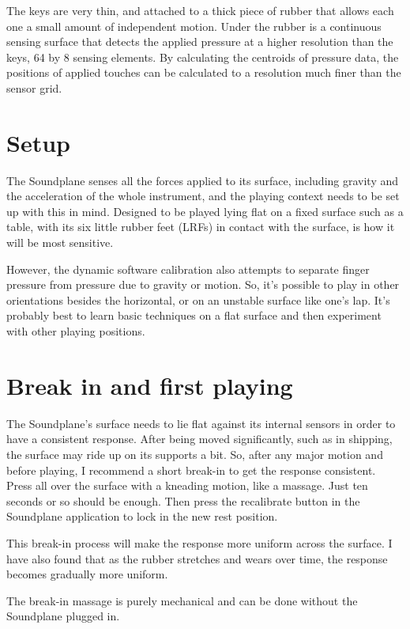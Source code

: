 The keys are very thin, and attached to a thick piece of rubber that allows each one a small amount of independent motion.  Under the rubber is a continuous sensing surface that detects the applied pressure at a higher resolution than the keys, 64 by 8 sensing elements.  By calculating the centroids of pressure data, the positions of applied touches can be calculated to a resolution much finer than the sensor grid.  

\section{Setup}

The Soundplane senses all the forces applied to its surface, including gravity and the acceleration of the whole instrument, and the playing context needs to be set up with this in mind.  Designed to be played lying flat on a fixed surface such as a table, with its six little rubber feet (LRFs) in contact with the surface, is how it will be most sensitive.  

However, the dynamic software calibration also attempts to separate finger pressure from pressure due to gravity or motion.  So, it’s possible to play in other orientations besides the horizontal, or on an unstable surface like one’s lap.  It's probably best to learn basic techniques on a flat surface and then experiment with other playing positions. 

\section{Break in and first playing}

The Soundplane's surface needs to lie flat against its internal sensors in order to have a consistent response.  After being moved significantly, such as in shipping, the surface may ride up on its supports a bit.  So, after any major motion and before playing, I recommend a short break-in to get the response consistent.  Press all over the surface with a kneading motion, like a massage.  Just ten seconds or so should be enough.  Then press the recalibrate button in the Soundplane application to lock in the new rest position. 

This break-in process will make the response more uniform across the surface.  I have also found that as the rubber stretches and wears over time, the response becomes gradually more uniform. 

The break-in massage is purely mechanical and can be done without the Soundplane plugged in.  

